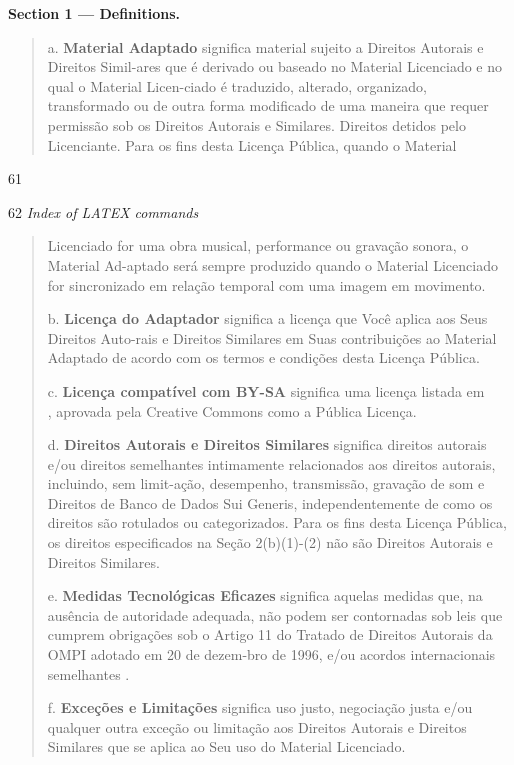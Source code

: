 \documentclass[
]{article}
\begin{document}
\textbf{Section 1 --- Definitions.}

\begin{quote}
a. \textbf{Material Adaptado} significa material sujeito a Direitos
Autorais e Direitos Simil-ares que é derivado ou baseado no Material
Licenciado e no qual o Material Licen-ciado é traduzido, alterado,
organizado, transformado ou de outra forma modificado de uma maneira que
requer permissão sob os Direitos Autorais e Similares. Direitos detidos
pelo Licenciante. Para os fins desta Licença Pública, quando o Material
\end{quote}

61

62 \emph{Index of LATEX commands}

\begin{quote}
Licenciado for uma obra musical, performance ou gravação sonora, o
Material Ad-aptado será sempre produzido quando o Material Licenciado
for sincronizado em relação temporal com uma imagem em movimento.

b. \textbf{Licença do Adaptador} significa a licença que Você aplica aos
Seus Direitos Auto-rais e Direitos Similares em Suas contribuições ao
Material Adaptado de acordo com os termos e condições desta Licença
Pública.

c. \textbf{Licença compatível com BY-SA} significa uma licença listada
em\\
, aprovada pela Creative Commons como a Pública Licença.

d. \textbf{Direitos Autorais e Direitos Similares} significa direitos
autorais e/ou direitos semelhantes intimamente relacionados aos direitos
autorais, incluindo, sem limit-ação, desempenho, transmissão, gravação
de som e Direitos de Banco de Dados Sui Generis, independentemente de
como os direitos são rotulados ou categorizados. Para os fins desta
Licença Pública, os direitos especificados na Seção 2(b)(1)-(2) não são
Direitos Autorais e Direitos Similares.

e. \textbf{Medidas Tecnológicas Eficazes} significa aquelas medidas que,
na ausência de autoridade adequada, não podem ser contornadas sob leis
que cumprem obrigações sob o Artigo 11 do Tratado de Direitos Autorais
da OMPI adotado em 20 de dezem-bro de 1996, e/ou acordos internacionais
semelhantes .

f. \textbf{Exceções e Limitações} significa uso justo, negociação justa
e/ou qualquer outra exceção ou limitação aos Direitos Autorais e
Direitos Similares que se aplica ao Seu uso do Material Licenciado.


\end{quote}
\end{document}
